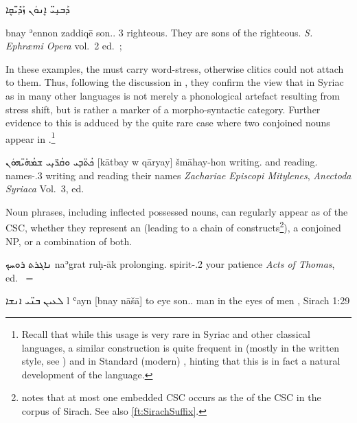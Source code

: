 {ܕܰܒܢܱܝ̈ ܐܷܢܘܿܢ ܙܰܕܺܝ̈ܩܷܐ}
{bnay \cb{}ʾennon zaddiqē
{son.\pl.\cst{} \cb{}3\pl{} righteous.\pl{}}
{They are sons of the righteous.}
{\textit{S. Ephræmi Opera} vol.\ 2 ed.\ \cite[384 D]{BenedictusEphraem}; \cite[158, \S 208A]{NoldekeSyriac}}


In these examples, the \prims must carry word-stress, otherwise clitics could not attach to them. Thus, following the discussion in , they confirm the view that \cst* in Syriac as in many other  languages is not merely a phonological artefact resulting from stress shift, but is rather a marker of a morpho-syntactic category. Further evidence to this is adduced by the quite rare case where two conjoined nouns appear in \cst*.\footnote{Recall that while this usage is very rare in Syriac and other classical  languages, a similar construction is quite frequent in \MHeb (mostly in the written style, see ) and in Standard (modern)  \citep[138f.]{BadawiCarter}, hinting that this is in fact a natural development of the language.}

{ܟܳܬ̈ܒܱܝ ܘܩܳܪ̈ܝܱܝ ܫܡܳܗܰܝ̈ܗܘܿܢ}
{[kātbay w\cb{} qāryay] šmāhay-hon}
{writing.\cst{} and\cb{} reading.\cst{} names-\poss.3\mpl}
{writing and reading their names}
{\textit{Zachariae Episcopi Mitylenes}, \textit{Anectoda Syriaca} Vol.\ 3, ed.\ \cite[136, 14]{Land} \apud \cite[158, \S 208A]{NoldekeSyriac}}


Noun phrases, including inflected possessed nouns, can regularly appear as \secns of the CSC, whether they represent an  (leading to a chain of constructs\footnote{\citet[187]{PeursenBenSira} notes that at most one embedded CSC occurs as the \secn of the CSC in the corpus of Sirach. See also \vref{ft:SirachSuffix}.}), a conjoined NP, or a combination of both.

{ܢܐ\hspace{-0.7ex}ܓܪܬ ܪܘܚܟ}
{naʾgrat ruḥ-āk}
{prolonging.\cst{} spirit-\poss.2\masc}
{your patience\footnotemark}
{\textit{Acts of Thomas}, ed.\ \cite[]{WrightActs} = \cite[37*]{MuraokaSyriac}}


{ܠܥܝܢ ܒܢ̈ܝ ܐܢܫܐ}
{l\cb{} ʿayn [bnay nāšā]}
{to\cb{} eye son.\pl.\cst{} man}
{in the eyes of men}
{\Pesh, Sirach 1:29 \apud \cite[186]{PeursenBenSira}}


}
